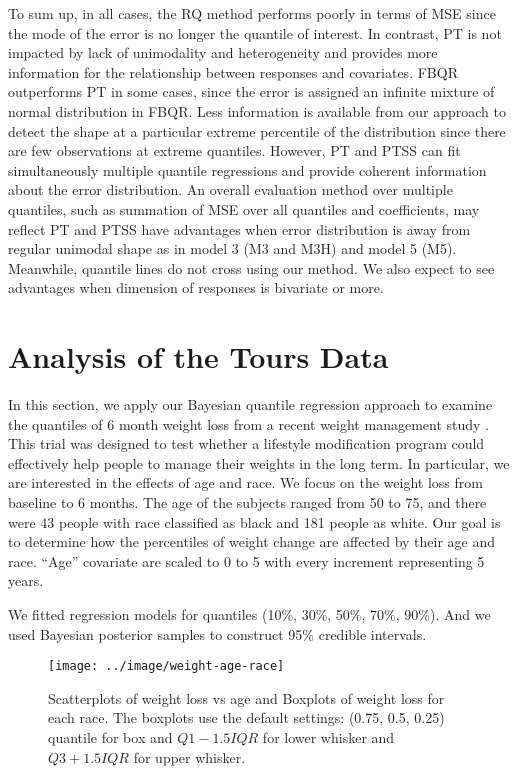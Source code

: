 \documentclass[12pt]{article}
\begin{document}
To sum up, in all cases, the RQ method performs poorly in terms of MSE
since the mode of the error is no longer the quantile of interest. In
contrast, PT is not impacted by lack of unimodality and heterogeneity
and provides more information for the relationship between responses
and covariates. FBQR outperforms PT in some cases, since the error is
assigned an infinite mixture of normal distribution in FBQR. Less
information is available from our approach to detect the shape at a
particular extreme percentile of the distribution since there are few
observations at extreme quantiles. However, PT and PTSS can fit
simultaneously multiple quantile regressions and provide coherent
information about the error distribution.  An overall evaluation
method over multiple quantiles, such as summation of MSE over all
quantiles and coefficients, may reflect PT and PTSS have advantages
when error distribution is away from regular unimodal shape as in
model 3 (M3 and M3H) and model 5 (M5).  Meanwhile, quantile lines do
not cross using our method.  We also expect to see advantages when
dimension of responses is bivariate or more.


\section{Analysis of the Tours Data}
\label{sec:tours}
In this section, we apply our Bayesian quantile regression approach to
examine the quantiles of 6 month weight loss from a recent weight
management study \citep{perri2008extended}.  This trial was designed
to test whether a lifestyle modification program could effectively
help people to manage their weights in the long term.  In particular,
we are interested in the effects of age and race.  We focus on the
weight loss from baseline to 6 months. The age of the subjects ranged
from 50 to 75, and there were 43 people with race classified as black
and 181 people as white.  Our goal is to determine how the percentiles
of weight change are affected by their age and race.  ``Age''
covariate are scaled to 0 to 5 with every increment representing 5
years.

We fitted regression models for quantiles (10\%, 30\%, 50\%, 70\%,
90\%). And we used Bayesian posterior samples to construct 95\%
credible intervals.

\begin{figure}[htbp]
  \centerline{\texttt{[image: ../image/weight-age-race]}}
  \caption[]{\label{fig:tours} Scatterplots of weight loss vs age and
    Boxplots of weight loss for each race.  The boxplots use the
    default settings: (0.75, 0.5, 0.25) quantile for box and
    $Q1-1.5IQR$ for lower whisker and $Q3+1.5IQR$ for upper whisker. }
\end{figure}
\end{document}
